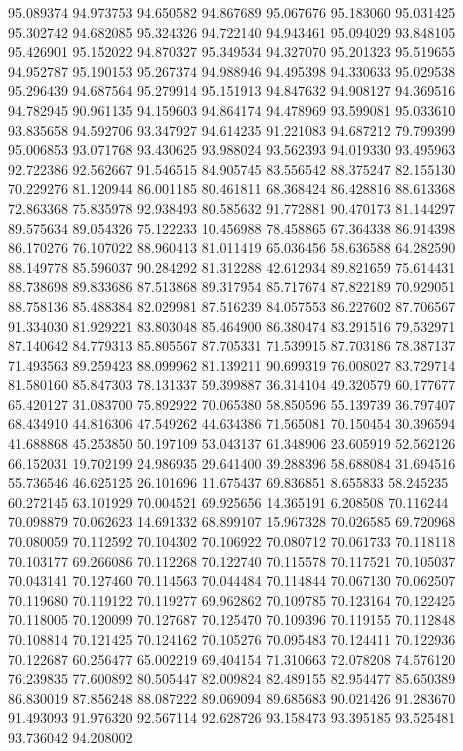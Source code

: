 95.089374
94.973753
94.650582
94.867689
95.067676
95.183060
95.031425
95.302742
94.682085
95.324326
94.722140
94.943461
95.094029
93.848105
95.426901
95.152022
94.870327
95.349534
94.327070
95.201323
95.519655
94.952787
95.190153
95.267374
94.988946
94.495398
94.330633
95.029538
95.296439
94.687564
95.279914
95.151913
94.847632
94.908127
94.369516
94.782945
90.961135
94.159603
94.864174
94.478969
93.599081
95.033610
93.835658
94.592706
93.347927
94.614235
91.221083
94.687212
79.799399
95.006853
93.071768
93.430625
93.988024
93.562393
94.019330
93.495963
92.722386
92.562667
91.546515
84.905745
83.556542
88.375247
82.155130
70.229276
81.120944
86.001185
80.461811
68.368424
86.428816
88.613368
72.863368
75.835978
92.938493
80.585632
91.772881
90.470173
81.144297
89.575634
89.054326
75.122233
10.456988
78.458865
67.364338
86.914398
86.170276
76.107022
88.960413
81.011419
65.036456
58.636588
64.282590
88.149778
85.596037
90.284292
81.312288
42.612934
89.821659
75.614431
88.738698
89.833686
87.513868
89.317954
85.717674
87.822189
70.929051
88.758136
85.488384
82.029981
87.516239
84.057553
86.227602
87.706567
91.334030
81.929221
83.803048
85.464900
86.380474
83.291516
79.532971
87.140642
84.779313
85.805567
87.705331
71.539915
87.703186
78.387137
71.493563
89.259423
88.099962
81.139211
90.699319
76.008027
83.729714
81.580160
85.847303
78.131337
59.399887
36.314104
49.320579
60.177677
65.420127
31.083700
75.892922
70.065380
58.850596
55.139739
36.797407
68.434910
44.816306
47.549262
44.634386
71.565081
70.150454
30.396594
41.688868
45.253850
50.197109
53.043137
61.348906
23.605919
52.562126
66.152031
19.702199
24.986935
29.641400
39.288396
58.688084
31.694516
55.736546
46.625125
26.101696
11.675437
69.836851
8.655833
58.245235
60.272145
63.101929
70.004521
69.925656
14.365191
6.208508
70.116244
70.098879
70.062623
14.691332
68.899107
15.967328
70.026585
69.720968
70.080059
70.112592
70.104302
70.106922
70.080712
70.061733
70.118118
70.103177
69.266086
70.112268
70.122740
70.115578
70.117521
70.105037
70.043141
70.127460
70.114563
70.044484
70.114844
70.067130
70.062507
70.119680
70.119122
70.119277
69.962862
70.109785
70.123164
70.122425
70.118005
70.120099
70.127687
70.125470
70.109396
70.119155
70.112848
70.108814
70.121425
70.124162
70.105276
70.095483
70.124411
70.122936
70.122687
60.256477
65.002219
69.404154
71.310663
72.078208
74.576120
76.239835
77.600892
80.505447
82.009824
82.489155
82.954477
85.650389
86.830019
87.856248
88.087222
89.069094
89.685683
90.021426
91.283670
91.493093
91.976320
92.567114
92.628726
93.158473
93.395185
93.525481
93.736042
94.208002
